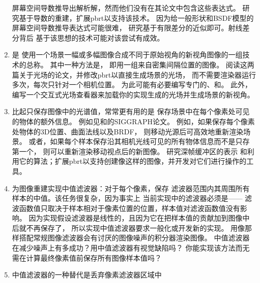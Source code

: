 \begin{enumerate}
            屏幕空间导数推导出解析解，然而他们没有在其论文中包含这些表达式。
            研究基于导数的重建，扩展pbrt以支持该技术。
            因为给一般形状和BSDF模型的屏幕空间导数推导表达式可能很难，
            研究基于有限差分的近似即可。射线差分背后
            基于该思想的技术可能对该尝试有成效。
      \item \circlethree {}是
            使用一个场景一幅或多幅图像合成不同于原始视角的新视角图像的一组技术的总称。
            其中一种方法是，
            即用一组来自密集间隔位置的图像\citep{10.1145/237170.237199,10.1145/237170.237200}。
            阅读这两篇关于光场的论文，并修改pbrt以直接生成场景的光场，
            而不需要渲染器运行多次，每次只针对一个相机位置。
            为此可能有必要编写专门的、和。
            此外，编写一个交互式光场查看器来加载你的实现生成的光场并生成场景的新视角。
      \item \circlethree 比起只保存图像中的光谱值，常常更有用的是
            保存场景中在每个像素处可见的物体的额外信息。
            例如见\citet{10.1145/325334.325247}和\citet{10.1145/97879.97901}的SIGGRAPH论文。
            例如，如果保存每个像素处物体的3D位置、曲面法线以及BRDF，
            则移动光源后可高效地重新渲染场景\citep{10.1145/344779.344938}。
            或者，如果每个样本保存沿其相机光线可见的所有物体信息而不是只存第一个，
            则可以重新渲染移动视点后的新图像\citep{10.1145/280814.280882}。
            研究深帧缓冲区的表示
            和利用它的算法；扩展pbrt以支持创建像这样的图像，并开发对它们进行操作的工具。
      \item \circletwo 为图像重建实现中值滤波器：对于每个像素，保存
            滤波器范围内其周围所有样本的中值。该任务很复杂，因为事实上
            当前实现中的滤波器必须是——
            滤波函数值只取决于样本相对于像素位置的位置，样本值对滤波函数值没有影响。
            因为实现假设滤波器是线性的，且因为它在把样本值的贡献加到图像中后就不再保存了，
            所以实现中值滤波器要求一般化或开发新的实现。
            用像那样搭配常规图像滤波器会有讨厌的图像噪声的积分器渲染图像。
            中值滤波器在减少噪声上有多成功？用中值滤波器有视觉缺陷吗？
            你能实现该方法而无需在计算最终像素值前保存所有图像样本值吗？
      \item \circletwo 中值滤波器的一种替代是丢弃像素滤波器区域中

\end{enumerate}

